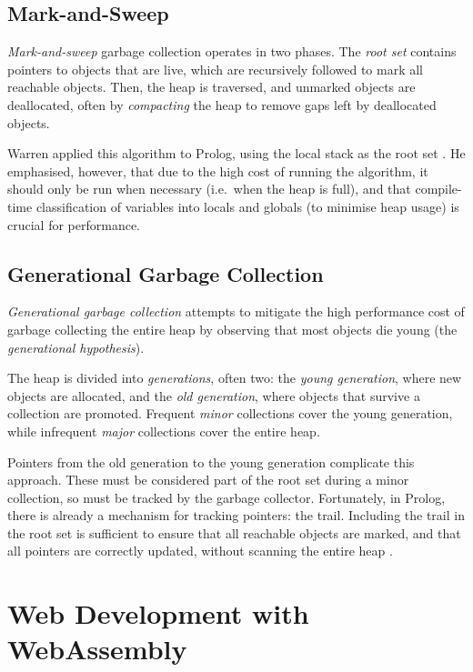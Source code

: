 \subsection{Mark-and-Sweep}

\label{sec:prep-mark-and-sweep}

\emph{Mark-and-sweep} garbage collection operates in two phases. The \emph{root set} contains pointers to objects that are live, which are recursively followed to mark all reachable objects. Then, the heap is traversed, and unmarked objects are deallocated, often by \emph{compacting} the heap to remove gaps left by deallocated objects.

Warren applied this algorithm to Prolog, using the local stack as the root set \cite{warrenImplementingPrologCompiling1977}. He emphasised, however, that due to the high cost of running the algorithm, it should only be run when necessary (i.e.\ when the heap is full), and that compile-time classification of variables into locals and globals (to minimise heap usage) is crucial for performance.

\subsection{Generational Garbage Collection}

\label{sec:generational-gc}

\emph{Generational garbage collection} attempts to mitigate the high performance cost of garbage collecting the entire heap by observing that most objects die young (the \emph{generational hypothesis}).

The heap is divided into \emph{generations}, often two: the \emph{young generation}, where new objects are allocated, and the \emph{old generation}, where objects that survive a collection are promoted. Frequent \emph{minor} collections cover the young generation, while infrequent \emph{major} collections cover the entire heap.

Pointers from the old generation to the young generation complicate this approach. These must be considered part of the root set during a minor collection, so must be tracked by the garbage collector. Fortunately, in Prolog, there is already a mechanism for tracking pointers: the trail. Including the trail in the root set is sufficient to ensure that all reachable objects are marked, and that all pointers are correctly updated, without scanning the entire heap \cite{bekkersDynamicMemoryManagement1992}.

\section{Web Development with WebAssembly}

